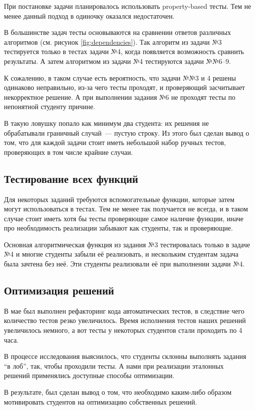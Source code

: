 При постановке задачи планировалось использовать property-based тесты.
Тем не менее данный подход в одиночку оказался недостаточен.

В большинстве задач тесты основываются на сравнении ответов различных алгоритмов (см. рисунок \ref{fig:dependencies}).
Так алгоритм из задачи №3 тестируется только в тестах задачи №4, когда появляется возможность сравнить результаты.
А затем алгоритмом из задачи №4 тестируются задачи №№6--9.

К сожалению, в таком случае есть вероятность, что задачи №№3 и 4 решены одинаково неправильно, из-за чего тесты проходят, и проверяющий засчитывает некорректное решение.
А при выполнении задания №6 не проходят тесты по непонятной студенту причине.

В такую ловушку попало как минимум два студента: их решения не обрабатывали граничный случай~--- пустую строку.
Из этого был сделан вывод о том, что для каждой задачи стоит иметь небольшой набор ручных тестов, проверяющих в том числе крайние случаи.

\subsection{Тестирование всех функций}

Для некоторых заданий требуются вспомогательные функции, которые затем могут использоваться в тестах.
Тем не менее так получается не всегда, и в таком случае стоит иметь хотя бы тесты проверяющие самое наличие функции, иначе про необходимость реализации забывают как студенты, так и проверяющие.

Основная алгоритмическая функция из задания №3 тестировалась только в задаче №4 и многие студенты забыли её реализовать, и нескольким студентам задача была зачтена без неё.
Эти студенты реализовали её при выполнении задачи №4.

\subsection{Оптимизация решений}

В мае был выполнен рефакторинг кода автоматических тестов, в следствие чего количество тестов резко увеличилось.
Время исполнения тестов наших решений увеличилось немного, а вот тесты у некоторых студентов стали проходить по 4 часа.

В процессе исследования выяснилось, что студенты склонны выполнять задания \enquote{в лоб}, так, чтобы проходили тесты.
А нами при реализации эталонных решений применялись доступные способы оптимизации.

В результате, был сделан вывод о том, что необходимо каким-либо образом мотивировать студентов на оптимизацию собственных решений.

